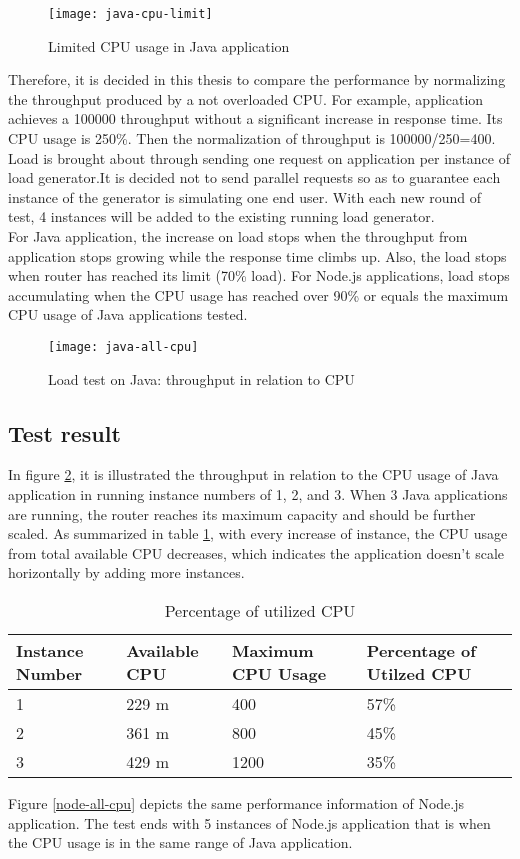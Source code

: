  \begin{figure}[h]
 	\centering
 	\texttt{[image: java-cpu-limit]}
 	\caption{Limited CPU usage in Java application}
 	\label{java-cpu-limit}
 \end{figure}
 
 Therefore, it is decided in this thesis to compare the performance by normalizing the throughput produced by a not overloaded CPU. For example, application achieves a 100000 throughput without a significant increase in response time. Its CPU usage is 250\%. Then the normalization of throughput is 100000/250=400. \\ 
Load is brought about through sending one request on application per instance of load generator.It is decided not to send parallel requests so as to guarantee each instance of the generator is simulating one end user. With each new round of test, 4 instances will be added to the existing running load generator.\\
 For Java application, the increase on load stops when the throughput from application stops growing while the response time climbs up. Also, the load stops when router has reached its limit (70\% load). For Node.js applications, load stops accumulating when the CPU usage has reached over 90\% or equals the maximum CPU usage of Java applications tested.
  
 \begin{figure}[h]
	\centering
	\texttt{[image: java-all-cpu]}
	\caption{Load test on Java: throughput in relation to CPU}
	\label{java-all-cpu}
\end{figure}
\subsection{Test result}
In figure \ref{java-all-cpu}, it is illustrated the throughput in relation to the CPU usage of Java application in running instance numbers of 1, 2, and 3. When 3 Java applications are running, the router reaches its maximum capacity and should be further scaled. As summarized in table \ref{java-cpu-usage}, with every increase of instance, the CPU usage from total available CPU decreases, which indicates the application doesn't scale horizontally by adding more instances. 
\begin{table}[h]
	\caption{Percentage of utilized CPU}
	\label{java-cpu-usage}
	\renewcommand{\arraystretch}{1.2}
	\centering
	\sffamily
	\begin{footnotesize}
		\begin{tabular}{l l l l  }
			\toprule
			\textbf{Instance Number} & \textbf{Available CPU} & \textbf{Maximum CPU Usage}& \textbf{Percentage of Utilzed CPU} }\\
		\midrule
		1 	&	229	m & 400 & 57\% \\
		2	&	361 m & 800& 45\% \\
		3	&	429 m &	1200 & 35\%\\
		\bottomrule
	\end{tabular}
\end{footnotesize}
\rmfamily
\end{table}

Figure \ref{node-all-cpu} depicts the same performance information of Node.js application. The test ends with 5 instances of Node.js application that is when the CPU usage is in the same range of Java application. 